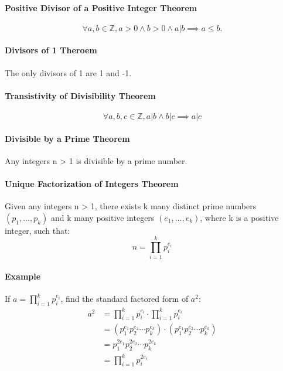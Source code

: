 \paragraph*{Positive Divisor of a Positive Integer Theorem}
\begin{equation*}
    \forall a,b \in \mathbb{Z}, a>0 \land b>0 \land a|b \implies a \leq b.
\end{equation*}

\paragraph*{Divisors of 1 Theroem}
The only divisors of 1 are 1 and -1.

\paragraph*{Transistivity of Divisibility Theorem}
\begin{equation*}
    \forall a,b,c \in \mathbb{Z}, a|b \land b|c \implies a|c
\end{equation*}

\paragraph*{Divisible by a Prime Theorem}
Any integers n > 1 is divisible by a prime number.

\paragraph*{Unique Factorization of Integers Theorem}
Given any integers n > 1, there exists k many distinct prime numbers $(p_1, \dots, p_k)$ and k many positive integers 
$(e_1, \dots, e_k)$, where k is a positive integer, such that:
\begin{equation*}
    n = \prod_{i=1}^k p_i^{e_i}
\end{equation*}

\paragraph*{Example}
If $a = \prod_{i=1}^k p_i^{e_i}$, find the standard factored form of $a^2$:
\begin{align*}
    a^2 &= \prod_{i=1}^k p_i^{e_i} \cdot \prod_{i=1}^k p_i^{e_i}\\
    &= (p_1^{e_1}p_2^{e_2} \cdots p_k^{e_k}) \cdot (p_1^{e_1}p_2^{e_2} \cdots p_k^{e_k})\\
    &= p_1^{2e_1}p_2^{2e_2} \cdots p_k^{2e_k}\\
    &= \prod_{i=1}^k p_i^{2e_i}
\end{align*}

